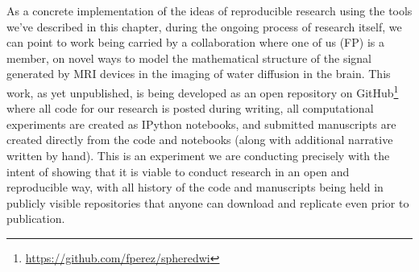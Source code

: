 \documentclass[ChapterTOCs,krantz2]{krantz} %
\begin{document}
As a concrete implementation of the ideas of reproducible research using the
tools we've described in this chapter, during the ongoing process of research
itself, we can point to work being carried by a collaboration where one of us
(FP) is a member, on novel ways to model the mathematical structure of the
signal generated by MRI devices in the imaging of water diffusion in the
brain.  This work, as yet unpublished, is being developed as an open repository
on GitHub\footnote{\url{https://github.com/fperez/spheredwi}} where all code
for our research is posted during writing, all computational experiments are
created as IPython notebooks, and submitted manuscripts are created directly
from the code and notebooks (along with additional narrative written by hand).
This is an experiment we are conducting precisely with the intent of showing
that it is viable to conduct research in an open and reproducible way, with all
history of the code and manuscripts being held in publicly visible repositories
that anyone can download and replicate even prior to publication. 
\end{document}
